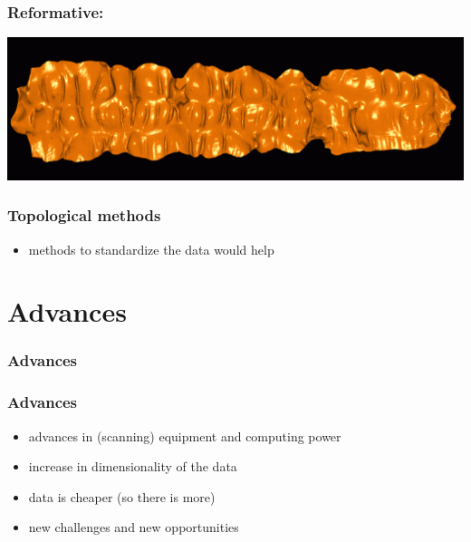 \documentclass{beamer}
\begin{document}
\begin{frame}
	\frametitle{Reformative:} %
	\includegraphics[width=\textwidth]{images/colon}
\end{frame}

\begin{frame}
	\frametitle{Topological methods}
	\begin{itemize}
		\item methods to standardize the data would help
	\end{itemize}
\end{frame}


\section{Advances}

\begin{frame}
	\frametitle{Advances}
\end{frame}

\begin{frame}
	\frametitle{Advances}
		\begin{itemize}
			\item advances in (scanning) equipment and computing power
			\item increase in dimensionality of the data
			\item data is cheaper (so there is more)
			\item new challenges and new opportunities
		\end{itemize}
\end{frame}

\end{document}
